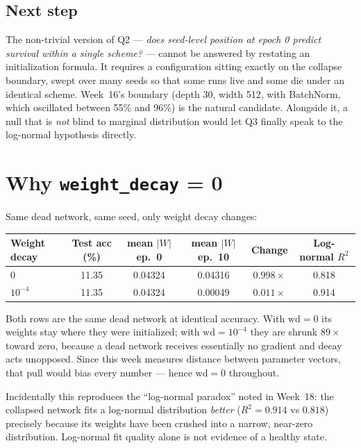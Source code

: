 \documentclass[11pt]{article}
\begin{document}
\subsection*{Next step}

The non-trivial version of Q2 --- \emph{does seed-level position at epoch 0 predict survival
within a single scheme?} --- cannot be answered by restating an initialization formula. It
requires a configuration sitting exactly on the collapse boundary, swept over many seeds so that
some runs live and some die under an identical scheme. Week~16's boundary (depth 30, width 512,
with BatchNorm, which oscillated between 55\% and 96\%) is the natural candidate. Alongside it,
a null that is \emph{not} blind to marginal distribution would let Q3 finally speak to the
log-normal hypothesis directly.

\appendix
\section{Why \texttt{weight\_decay} = 0}

Same dead network, same seed, only weight decay changes:

\begin{table}[htbp]\centering
\begin{tabular}{lccccc}
\toprule
Weight decay & Test acc (\%) & mean $|W|$ ep.\ 0 & mean $|W|$ ep.\ 10 & Change & Log-normal $R^2$ \\
\midrule
$0$        & 11.35 & 0.04324 & 0.04316 & $0.998\times$ & 0.818 \\
$10^{-4}$  & 11.35 & 0.04324 & 0.00049 & $\mathbf{0.011\times}$ & 0.914 \\
\bottomrule
\end{tabular}
\end{table}

Both rows are the same dead network at identical accuracy. With $\text{wd}=0$ its weights stay
where they were initialized; with $\text{wd}=10^{-4}$ they are shrunk $89\times$ toward zero,
because a dead network receives essentially no gradient and decay acts unopposed. Since this week
measures distance between parameter vectors, that pull would bias every number --- hence
$\text{wd}=0$ throughout.

Incidentally this reproduces the ``log-normal paradox'' noted in Week~18: the collapsed network
fits a log-normal distribution \emph{better} ($R^2 = 0.914$ vs $0.818$) precisely because its
weights have been crushed into a narrow, near-zero distribution. Log-normal fit quality alone is
not evidence of a healthy state.
\end{document}
